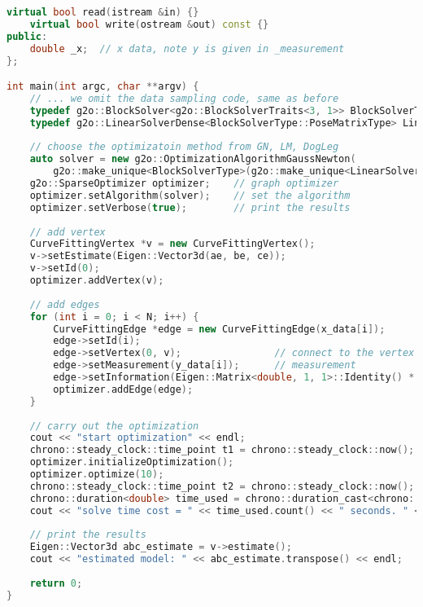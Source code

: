 \begin{lstlisting}[language=c++,caption=slambook/ch6/g2oCurveFitting.cpp]
    virtual bool read(istream &in) {}
    virtual bool write(ostream &out) const {}
public:
    double _x;  // x data, note y is given in _measurement
};

int main(int argc, char **argv) {
    // ... we omit the data sampling code, same as before
    typedef g2o::BlockSolver<g2o::BlockSolverTraits<3, 1>> BlockSolverType;  // bolck solver 
    typedef g2o::LinearSolverDense<BlockSolverType::PoseMatrixType> LinearSolverType; // linear solver
    
    // choose the optimizatoin method from GN, LM, DogLeg 
    auto solver = new g2o::OptimizationAlgorithmGaussNewton(
        g2o::make_unique<BlockSolverType>(g2o::make_unique<LinearSolverType>()));
    g2o::SparseOptimizer optimizer;    // graph optimizer
    optimizer.setAlgorithm(solver);    // set the algorithm
    optimizer.setVerbose(true);        // print the results
    
    // add vertex
    CurveFittingVertex *v = new CurveFittingVertex();
    v->setEstimate(Eigen::Vector3d(ae, be, ce));
    v->setId(0);
    optimizer.addVertex(v);
    
    // add edges
    for (int i = 0; i < N; i++) {
        CurveFittingEdge *edge = new CurveFittingEdge(x_data[i]);
        edge->setId(i);
        edge->setVertex(0, v);                // connect to the vertex
        edge->setMeasurement(y_data[i]);      // measurement
        edge->setInformation(Eigen::Matrix<double, 1, 1>::Identity() * 1 / (w_sigma * w_sigma)); // set the information matrix
        optimizer.addEdge(edge);
    }
    
    // carry out the optimization
    cout << "start optimization" << endl;
    chrono::steady_clock::time_point t1 = chrono::steady_clock::now();
    optimizer.initializeOptimization();
    optimizer.optimize(10);
    chrono::steady_clock::time_point t2 = chrono::steady_clock::now();
    chrono::duration<double> time_used = chrono::duration_cast<chrono::duration<double>>(t2 - t1);
    cout << "solve time cost = " << time_used.count() << " seconds. " << endl;
    
    // print the results
    Eigen::Vector3d abc_estimate = v->estimate();
    cout << "estimated model: " << abc_estimate.transpose() << endl;
    
    return 0;
}
\end{lstlisting}

